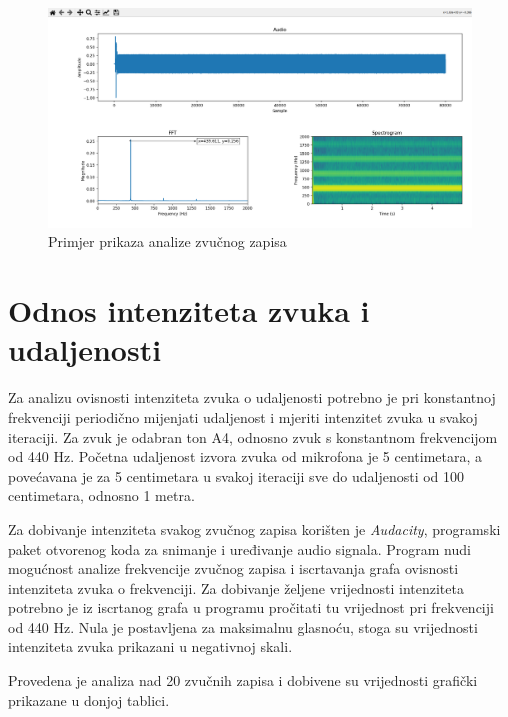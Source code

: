 \begin{figure}[ht]
	\includegraphics[width=\linewidth]{imgs/analyse_example}
	\caption{Primjer prikaza analize zvučnog zapisa}
	\label{fig:analyse_example}
\end{figure}

\section{Odnos intenziteta zvuka i udaljenosti}

Za analizu ovisnosti intenziteta zvuka o udaljenosti potrebno je pri konstantnoj frekvenciji periodično mijenjati udaljenost i mjeriti intenzitet zvuka u svakoj iteraciji. Za zvuk je odabran ton A4, odnosno zvuk s konstantnom frekvencijom od 440 Hz. Početna udaljenost izvora zvuka od mikrofona je 5 centimetara, a povećavana je za 5 centimetara u svakoj iteraciji sve do udaljenosti od 100 centimetara, odnosno 1 metra. 

Za dobivanje intenziteta svakog zvučnog zapisa korišten je \textit{Audacity}, programski paket otvorenog koda za snimanje i  uređivanje audio signala. Program nudi mogućnost analize frekvencije zvučnog zapisa i iscrtavanja grafa ovisnosti intenziteta zvuka o frekvenciji. Za dobivanje željene vrijednosti intenziteta potrebno je iz iscrtanog grafa u programu pročitati tu vrijednost pri frekvenciji od 440 Hz. Nula je postavljena za maksimalnu glasnoću, stoga su vrijednosti intenziteta zvuka prikazani u negativnoj skali. 

Provedena je analiza nad 20 zvučnih zapisa i dobivene su vrijednosti grafički prikazane u donjoj tablici. 


